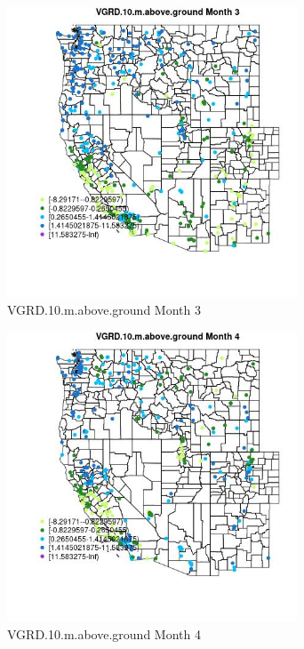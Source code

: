 \begin{figure} 
\centering  
\includegraphics[width=0.77\textwidth]{Code_Outputs/Report_ML_input_PM25_Step4_part_e_de_duplicated_aves_compiled_2019-05-18wNAs_MapObsMo3VGRD10maboveground.jpg} 
\caption{\label{fig:Report_ML_input_PM25_Step4_part_e_de_duplicated_aves_compiled_2019-05-18wNAsMapObsMo3VGRD10maboveground}VGRD.10.m.above.ground Month 3} 
\end{figure} 
 

\clearpage 

\begin{figure} 
\centering  
\includegraphics[width=0.77\textwidth]{Code_Outputs/Report_ML_input_PM25_Step4_part_e_de_duplicated_aves_compiled_2019-05-18wNAs_MapObsMo4VGRD10maboveground.jpg} 
\caption{\label{fig:Report_ML_input_PM25_Step4_part_e_de_duplicated_aves_compiled_2019-05-18wNAsMapObsMo4VGRD10maboveground}VGRD.10.m.above.ground Month 4} 
\end{figure} 
 

